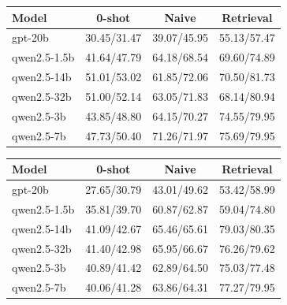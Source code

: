 \begin{tabular}{|l|c|c|c}
\hline
Model & 0-shot & Naive & Retrieval \\
\hline
gpt-20b & 30.45/31.47 & 39.07/45.95 & 55.13/57.47 \\
qwen2.5-1.5b & 41.64/47.79 & 64.18/68.54 & 69.60/74.89 \\
qwen2.5-14b & 51.01/53.02 & 61.85/72.06 & 70.50/81.73 \\
qwen2.5-32b & 51.00/52.14 & 63.05/71.83 & 68.14/80.94 \\
qwen2.5-3b & 43.85/48.80 & 64.15/70.27 & 74.55/79.95 \\
qwen2.5-7b & 47.73/50.40 & 71.26/71.97 & 75.69/79.95 \\
\hline
\end{tabular}

\begin{tabular}{|l|c|c|c}
\hline
Model & 0-shot & Naive & Retrieval \\
\hline
gpt-20b & 27.65/30.79 & 43.01/49.62 & 53.42/58.99 \\
qwen2.5-1.5b & 35.81/39.70 & 60.87/62.87 & 59.04/74.80 \\
qwen2.5-14b & 41.09/42.67 & 65.46/65.61 & 79.03/80.35 \\
qwen2.5-32b & 41.40/42.98 & 65.95/66.67 & 76.26/79.62 \\
qwen2.5-3b & 40.89/41.42 & 62.89/64.50 & 75.03/77.48 \\
qwen2.5-7b & 40.06/41.28 & 63.86/64.31 & 77.27/79.95 \\
\hline
\end{tabular}

